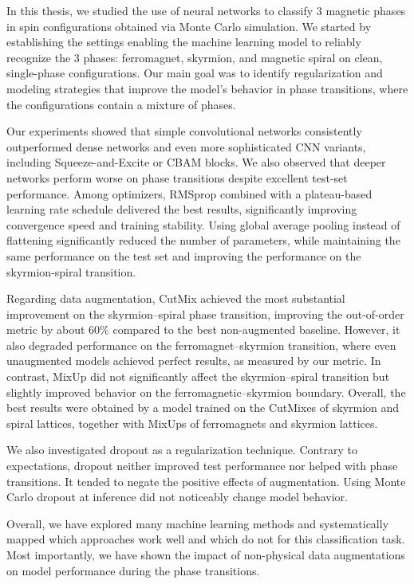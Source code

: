

In this thesis, we studied the use of neural networks to classify $3$ magnetic phases in spin configurations obtained via Monte Carlo simulation. We started by establishing the settings enabling the machine learning model to reliably recognize the $3$ phases: ferromagnet, skyrmion, and magnetic spiral on clean, single-phase configurations.  Our main goal was to identify regularization and modeling strategies that improve the model's behavior in phase transitions, where the configurations contain a mixture of phases.

Our experiments showed that simple convolutional networks consistently outperformed dense networks and even more sophisticated CNN variants, including Squeeze-and-Excite or CBAM blocks. We also observed that deeper networks perform worse on phase transitions despite excellent test-set performance. Among optimizers, RMSprop combined with a plateau-based learning rate schedule delivered the best results, significantly improving convergence speed and training stability. Using global average pooling instead of flattening significantly reduced the number of parameters, while maintaining the same performance on the test set and improving the performance on the skyrmion-spiral transition.

Regarding data augmentation, CutMix achieved the most substantial improvement on the skyrmion–spiral phase transition, improving the out-of-order metric by about $60\%$ compared to the best non-augmented baseline. However, it also degraded performance on the ferromagnet–skyrmion transition, where even unaugmented models achieved perfect results, as measured by our metric. In contrast, MixUp did not significantly affect the skyrmion–spiral transition but slightly improved behavior on the ferromagnetic–skyrmion boundary. Overall, the best results were obtained by a model trained on the CutMixes of skyrmion and spiral lattices, together with MixUps of ferromagnets and skyrmion lattices.

We also investigated dropout as a regularization technique. Contrary to expectations, dropout neither improved test performance nor helped with phase transitions. It tended to negate the positive effects of augmentation. Using Monte Carlo dropout at inference did not noticeably change model behavior.

Overall, we have explored many machine learning methods and systematically mapped which approaches work well and which do not for this classification task. Most importantly, we have shown the impact of non-physical data augmentations on model performance during the phase transitions.